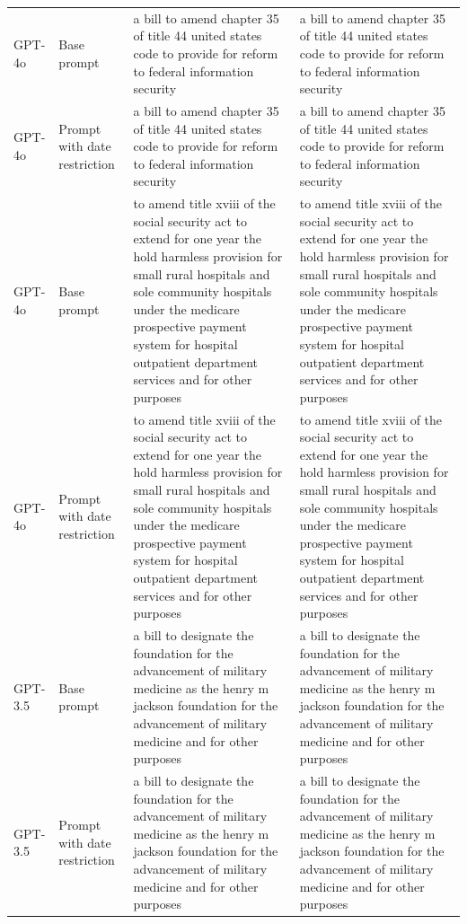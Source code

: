 \begin{longtable}{>{\raggedright\arraybackslash}p{1.4cm}>{\raggedright\arraybackslash}p{1.4cm}>{\raggedright\arraybackslash}p{5.5cm}>{\raggedright\arraybackslash}p{5.5cm}}
GPT-4o & Base prompt & a bill to amend chapter 35 of title 44 united states code to provide for reform to federal information security & a bill to amend chapter 35 of title 44 united states code to provide for reform to federal information security\\
GPT-4o & Prompt with date restriction & a bill to amend chapter 35 of title 44 united states code to provide for reform to federal information security & a bill to amend chapter 35 of title 44 united states code to provide for reform to federal information security\\
GPT-4o & Base prompt & to amend title xviii of the social security act to extend for one year the hold harmless provision for small rural hospitals and sole community hospitals under the medicare prospective payment system for hospital outpatient department services and for other purposes & to amend title xviii of the social security act to extend for one year the hold harmless provision for small rural hospitals and sole community hospitals under the medicare prospective payment system for hospital outpatient department services and for other purposes\\
GPT-4o & Prompt with date restriction & to amend title xviii of the social security act to extend for one year the hold harmless provision for small rural hospitals and sole community hospitals under the medicare prospective payment system for hospital outpatient department services and for other purposes & to amend title xviii of the social security act to extend for one year the hold harmless provision for small rural hospitals and sole community hospitals under the medicare prospective payment system for hospital outpatient department services and for other purposes\\
GPT-3.5 & Base prompt & a bill to designate the foundation for the advancement of military medicine as the henry m jackson foundation for the advancement of military medicine and for other purposes & a bill to designate the foundation for the advancement of military medicine as the henry m jackson foundation for the advancement of military medicine and for other purposes\\
GPT-3.5 & Prompt with date restriction & a bill to designate the foundation for the advancement of military medicine as the henry m jackson foundation for the advancement of military medicine and for other purposes & a bill to designate the foundation for the advancement of military medicine as the henry m jackson foundation for the advancement of military medicine and for other purposes\\

\end{longtable}
